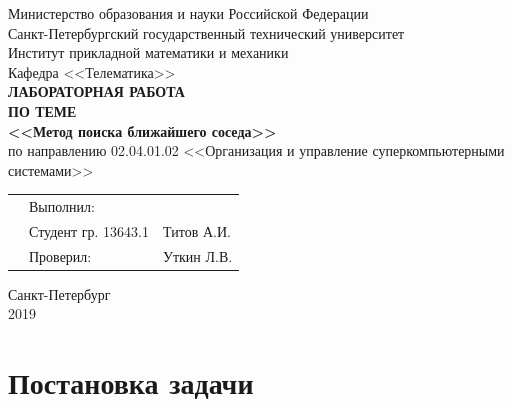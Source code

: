 \documentclass[]{article}
\numberwithin{equation}{section}
\begin{document}
    \thispagestyle{empty}
	\begin{center}
		Министерство образования и науки Российской Федерации\\
		Санкт-Петербургский государственный технический университет\\
		Институт прикладной математики и механики\\
		Кафедра <<Телематика>>\\
		\vspace{5cm}
		\textbf{\textbf{ЛАБОРАТОРНАЯ РАБОТА}}\\
        \vspace{0.5cm}
        \textbf{ПО ТЕМЕ}\\
        \vspace{0.5cm}
		\textbf{\textbf{<<Метод поиска ближайшего соседа>>}}\\
		\vspace{3cm}
		по направлению 02.04.01.02 <<Организация и управление суперкомпьютерными системами>>
	\end{center}
	\vspace{2cm}
	\begin{tabular} {l l l}
	\hspace{9.5cm} & Выполнил: & \\
	& Студент гр. 13643.1 & Титов А.И.\\
	& Проверил: & Уткин Л.В.
	\end{tabular}
	\vspace{4.5cm}
	\begin{center}
		Санкт-Петербург\\
		2019
    \end{center}


	\renewcommand\contentsname{Оглавление}
	\tableofcontents

    \newpage
    \section*{Постановка задачи}
\end{document}
